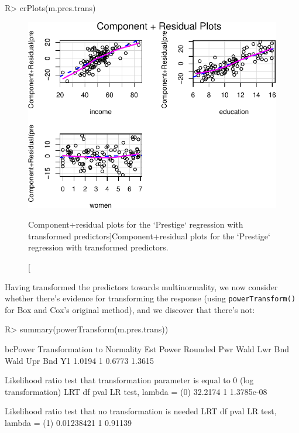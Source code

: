 \documentclass[
]{jss}
\begin{document}
\begin{CodeChunk}
\begin{CodeInput}
R> crPlots(m.pres.trans)
\end{CodeInput}
\begin{figure}

{\centering \includegraphics{JSS-article_files/figure-latex/CR-plots-transformed-1} 

}

\caption[Component+residual plots for the `Prestige` regression with transformed predictors]{Component+residual plots for the `Prestige` regression with transformed predictors.}\label{fig:CR-plots-transformed}
\end{figure}
\end{CodeChunk}

Having transformed the predictors towards multinormality, we now
consider whether there's evidence for transforming the response (using
\texttt{powerTransform()} for Box and Cox's original method), and we
discover that there's not:

\begin{CodeChunk}
\begin{CodeInput}
R> summary(powerTransform(m.pres.trans))
\end{CodeInput}
\begin{CodeOutput}
bcPower Transformation to Normality 
   Est Power Rounded Pwr Wald Lwr Bnd Wald Upr Bnd
Y1    1.0194           1       0.6773       1.3615

Likelihood ratio test that transformation parameter is equal to 0
 (log transformation)
                          LRT df       pval
LR test, lambda = (0) 32.2174  1 1.3785e-08

Likelihood ratio test that no transformation is needed
                             LRT df    pval
LR test, lambda = (1) 0.01238421  1 0.91139
\end{CodeOutput}
\end{CodeChunk}
\end{document}
